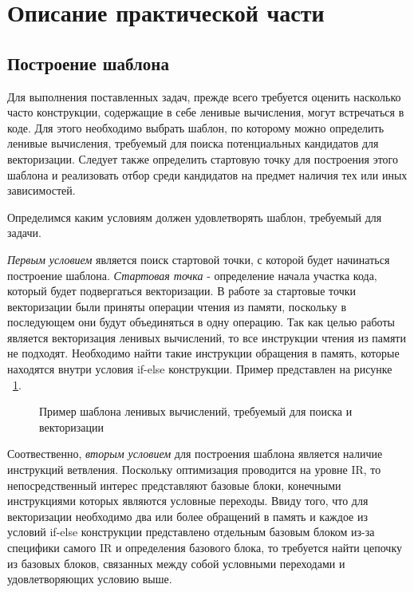 \section{Описание практической части}
\label{sec:Chapter4} 


\subsection{Построение шаблона}
Для выполнения поставленных задач, прежде всего требуется оценить насколько часто конструкции, содержащие в себе ленивые вычисления, могут встречаться в коде. Для этого необходимо выбрать шаблон, по которому можно определить ленивые вычисления, требуемый для поиска потенциальных кандидатов для векторизации. Следует также определить стартовую точку для построения этого шаблона и реализовать отбор среди кандидатов на предмет наличия тех или иных зависимостей.

Определимся каким условиям должен удовлетворять шаблон, требуемый для задачи. 

\textit{Первым условием} является поиск стартовой точки, с которой будет начинаться построение шаблона. \textit{Стартовая точка} - определение начала участка кода, который будет подвергаться векторизации. В работе за стартовые точки векторизации были приняты операции чтения из памяти, поскольку в последующем они будут объединяться в одну операцию. Так как целью работы является векторизация ленивых вычислений, то все инструкции чтения из памяти не подходят. Необходимо найти такие инструкции обращения в память, которые находятся внутри условия if-else конструкции. Пример представлен на рисунке ~\ref{4lazy}.

\begin{figure}[!htb]
    \centering
    
    \caption{Пример шаблона ленивых вычислений, требуемый для поиска и векторизации}
    \label{4lazy}
\end{figure}

Соотвественно, \textit{вторым условием} для построения шаблона является наличие инструкций ветвления. Поскольку оптимизация проводится на уровне IR, то непосредственный интерес представляют базовые блоки, конечными инструкциями которых являются условные переходы. Ввиду того, что для векторизации необходимо два или более обращений в память и каждое из условий if-else конструкции представлено отдельным базовым блоком из-за специфики самого IR и определения базового блока, то требуется найти цепочку из базовых блоков, связанных между собой условными переходами и удовлетворяющих условию выше.

